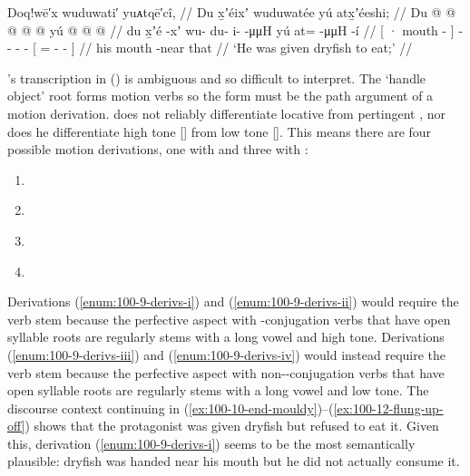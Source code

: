\ex\label{ex:100-9-given-dryfish}%
%
\begingl
	\glpreamble	Doq!wē′x wuduwati′ yuᴀtqē′cî, //
	\glpreamble	Du x̱ʼéixʼ wuduwatée yú atx̱ʼéeshi; //
	\gla	{} Du  @ {} {}
			 @ {} @ {} @ {} @ {}
			{} yú  @ {} @ {} @ {} {} //
	\glb	{} du x̱ʼé -xʼ {}
			wu- du- i-  -μμH
			{} yú at=  -μμH -í {} //
	\glc	{}[ · mouth - {}]
			- - -  -
			{}[  =  - - {}] //
	\gld	{} his mouth -near {}
			 {} {} {} {}
			{} that  {} {} {} {} //
	\glft	‘He was given dryfish to eat;’
		//
\endgl
\xe

\citeauthor{swanton:1911}’s transcription  in (\lastx) is ambiguous and so difficult to interpret.
The  ‘handle object’ root forms motion verbs so the form  must be the path argument of a motion derivation.
\citeauthor{swanton:1911} does not reliably differentiate locative  from pertingent , nor does he differentiate high tone  [] from low tone  [].
This means there are four possible motion derivations, one with  and three with :

\begin{enumerate}[label=\roman*., ref=\roman*]
\item\label{enum:100-9-derivs-i}%
\item\label{enum:100-9-derivs-ii}%
\item\label{enum:100-9-derivs-iii}%
\item\label{enum:100-9-derivs-iv}%
\end{enumerate}

Derivations (\ref{enum:100-9-derivs-i}) and (\ref{enum:100-9-derivs-ii}) would require the verb stem  because the perfective aspect with -conjugation verbs that have open syllable roots are regularly  stems with a long vowel and high tone.
Derivations (\ref{enum:100-9-derivs-iii}) and (\ref{enum:100-9-derivs-iv}) would instead require the verb stem  because the perfective aspect with non--conjugation verbs that have open syllable roots are regularly  stems with a long vowel and low tone.
The discourse context continuing in (\ref{ex:100-10-end-mouldy})–(\ref{ex:100-12-flung-up-off}) shows that the protagonist was given dryfish but refused to eat it.
Given this, derivation (\ref{enum:100-9-derivs-i}) seems to be the most semantically plausible: dryfish was handed near his mouth but he did not actually consume it.


